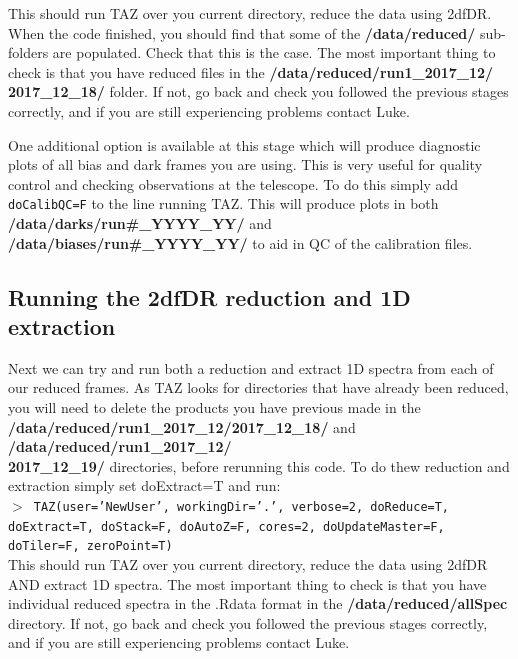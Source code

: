 \documentclass[12pt]{article}
\begin{document}
This should run TAZ over you current directory, reduce the data using 2dfDR. When the code finished, you should find that some of the \textbf{/data/reduced/} sub-folders are populated. Check that this is the case. The most important thing to check is that you have reduced files in the \textbf{/data/reduced/run1\_2017\_12/ \\ 2017\_12\_18/} folder.  If not, go back and check you followed the previous stages correctly, and if you are still experiencing problems contact Luke.  

One additional option is available at this stage which will produce diagnostic plots of all bias and dark frames you are using. This is very useful for quality control and checking observations at the telescope. To do this simply add \texttt{doCalibQC=F} to the line running TAZ. This will produce plots in both \textbf{/data/darks/run\#\_YYYY\_YY/} and \textbf{/data/biases/run\#\_YYYY\_YY/} to aid in QC of the calibration files.


\subsection{Running the 2dfDR reduction and 1D extraction}

Next we can try and run both a reduction and extract 1D spectra from each of our reduced frames. As TAZ looks for directories that have already been reduced, you will need to delete the products you have previous made in the \textbf{/data/reduced/run1\_2017\_12/2017\_12\_18/} and \textbf{/data/reduced/run1\_2017\_12/ \\ 2017\_12\_19/} directories, before rerunning this code. To do thew reduction and extraction simply set doExtract=T and run:\\

\hspace{10mm} \texttt{$>$ TAZ(user='NewUser', workingDir='.', verbose=2, doReduce=T, doExtract=T, doStack=F, doAutoZ=F, cores=2, doUpdateMaster=F, doTiler=F, zeroPoint=T)}\\

This should run TAZ over you current directory, reduce the data using 2dfDR AND extract 1D spectra. The most important thing to check is that you have individual reduced spectra in the .Rdata format in the \textbf{/data/reduced/allSpec} directory. If not, go back and check you followed the previous stages correctly, and if you are still experiencing problems contact Luke.  \\
\end{document}
